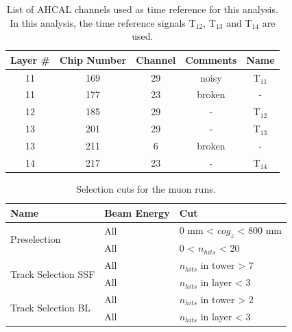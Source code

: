 \documentclass{JINST}
\begin{document}
\begin{table}[htb!]
  \centering
  \caption{List of AHCAL channels used as time reference for this analysis. In this analysis, the time reference signals T$_{12}$, T$_{13}$ and T$_{14}$ are used.}
  \label{table:trigger_ref}
  \begin{tabular}{@{} ccccc @{}}
    \toprule
    Layer \# & Chip Number & Channel & Comments & Name \\
    \midrule
    11 & 169 & 29 & noisy & T$_{11}$ \\
    11 & 177 & 23 & broken & - \\
    12 & 185 & 29 & - & T$_{12}$ \\
    13 & 201 & 29 & -  & T$_{13}$ \\
    13 & 211 & 6 & broken & - \\
    14 & 217 & 23 & - & T$_{14}$ \\
    \bottomrule
  \end{tabular}
\end{table}

\begin{table}[htb!]
  \centering
  \caption{Selection cuts for the muon runs.}
  \label{table:muon_sel}
  \begin{tabular}{@{}lll@{}}
    \toprule
    \multicolumn{1}{l}{\textbf{Name}} & \textbf{Beam Energy} & \textbf{Cut}\\
    \midrule
    \multirow{2}{*}{Preselection}& All & 0 mm < $cog_{z}$ < 800 mm\\& All & 0 < $n_{hits}$ < 20 \\
    \multirow{2}{*}{Track Selection SSF}& All & $n_{hits}$ in tower > 7 \\& All & $n_{hits}$ in layer < 3 \\
    \multirow{2}{*}{Track Selection BL}& All & $n_{hits}$ in tower > 2 \\& All & $n_{hits}$ in layer < 3 \\
    \bottomrule
  \end{tabular}
\end{table}
\end{document}
